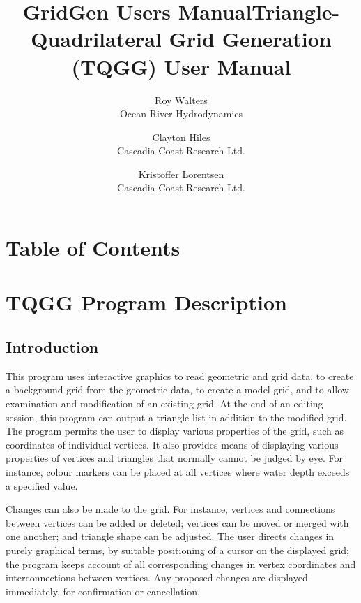 \documentclass{article}
\title{GridGen Users Manual}
\begin{document}
\title{Triangle-Quadrilateral Grid Generation (TQGG) User Manual}

\author{Roy Walters \\
  Ocean-River Hydrodynamics \\
\and
  Clayton Hiles \\
  Cascadia Coast Research Ltd. \\
\and
  Kristoffer Lorentsen \\
  Cascadia Coast Research Ltd.}

\maketitle


\section*{Table of Contents}

\setcounter{tocdepth}{2}
\tableofcontents


\section{TQGG Program Description}

\label{bkm:Ref406485171}\label{bkm:Ref406484745}\subsection{Introduction}
This program uses interactive graphics to read geometric and grid data, to create a background grid from the geometric data, to create a model grid, and to allow examination and modification of an existing grid. At the end of an editing session, this program can output a triangle list in addition to the modified grid. The program permits the user to display various properties of the grid, such as coordinates of individual vertices. It also provides means of displaying various properties of vertices and triangles that normally cannot be judged by eye. For instance, colour markers can be placed at all vertices where water depth exceeds a specified value.

Changes can also be made to the grid. For instance, vertices and connections between vertices can be added or deleted; vertices can be moved or merged with one another; and triangle shape can be adjusted. The user directs changes in purely graphical terms, by suitable positioning of a cursor on the displayed grid; the program keeps account of all corresponding changes in vertex coordinates and interconnections between vertices. Any proposed changes are displayed immediately, for confirmation or cancellation.
\end{document}
